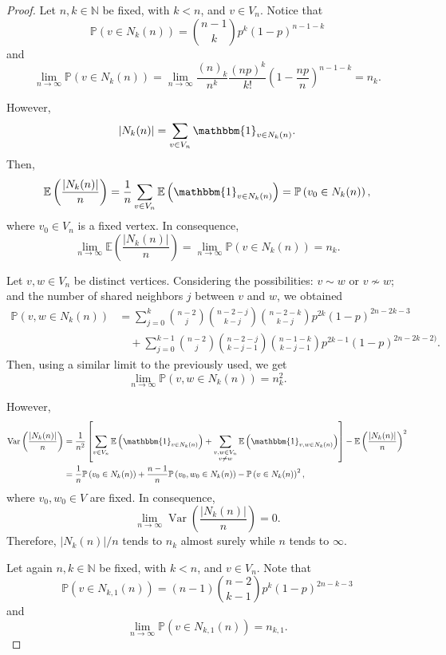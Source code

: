 \documentclass[a4paper]{article}
\newcommand{\N}{\mathbb{N}}
\newcommand{\abs}[1]{\left\lvert#1\right\rvert}
\newcommand{\Pp}[1]{\mathbb{P}\left(#1\right)}
\newcommand{\E}[1]{\mathbb{E}\left(#1\right)}
\DeclareMathOperator{\var}{Var}
\newcommand{\Var}[1]{\var\left(#1\right)}
\theoremstyle{plain}
\begin{document}
\begin{proof}
    Let \(n,k \in \N\) be fixed, with \(k < n\), and \(v \in V_n\). Notice that
    \[
        \Pp{v \in N_k(n)} = \binom{n-1}{k}p^k(1-p)^{n-1-k}
    \]
    and
    \[
        \lim_{n \to \infty} \Pp{v \in N_k(n)} = \lim_{n \to \infty} \frac{(n)_k}{n^k}\frac{(np)^k}{k!} \left(1 - \frac{np}{n}\right)^{n-1-k} = n_k.
    \]
    
    However,
    \[
        \abs{N_k(n)} = \sum_{v \in V_n} \mathbbm{1}_{v \in N_k(n)}.
    \]
    Then,
    \[
        \E{\frac{\abs{N_k(n)}}{n}} = \frac{1}{n}\sum_{v \in V_n} \E{\mathbbm{1}_{v \in N_k(n)}} = \Pp{v_0 \in N_k(n)},
    \]
    where \(v_0 \in V_n\) is a fixed vertex. In consequence,
    \[
        \lim_{n \to \infty} \E{\frac{\abs{N_k(n)}}{n}} = \lim_{n \to \infty} \Pp{v \in N_k(n)} = n_k.
    \]

    Let \(v,w \in V_n\) be distinct vertices. Considering the possibilities: \(v \sim w\) or \(v \not\sim w\); and the number of shared neighbors \(j\) between \(v\) and \(w\), we obtained
    \begin{align*}
        \Pp{v,w \in N_k(n)} &= \sum_{j = 0}^k \binom{n-2}{j}\binom{n-2-j}{k-j}\binom{n-2-k}{k-j}p^{2k}(1-p)^{2n-2k-3}\\
        &\quad + \sum_{j = 0}^{k-1} \binom{n-2}{j}\binom{n-2-j}{k-j-1}\binom{n-1-k}{k-j-1}p^{2k-1}(1-p)^{2n-2k-2)}.
    \end{align*}
    Then, using a similar limit to the previously used, we get
    \[
        \lim_{n \to \infty} \Pp{v,w \in N_k(n)} = n_k^2.
    \]
    
    However,
    \begin{align*}
        \Var{\frac{\abs{N_k(n)}}{n}} &= \frac{1}{n^2}\left[\sum_{v \in V_n}\E{\mathbbm{1}_{v \in N_k(n)}} + \sum_{\substack{v,w \in V_n\\
        v \neq w}} \E{\mathbbm{1}_{v, w \in N_k(n)}}\right] - \E{\frac{\abs{N_k(n)}}{n}}^2\\
        &= \frac{1}{n}\Pp{v_0 \in N_k(n)} + \frac{n-1}{n}\Pp{v_0,w_0 \in N_k(n)} - \Pp{v \in N_k(n)}^2,
    \end{align*}
    where \(v_0,w_0 \in V\) are fixed. In consequence,
    \[
        \lim_{n \to \infty} \Var{\frac{\abs{N_k(n)}}{n}} = 0.
    \]
    Therefore, \(\abs{N_k(n)}/n\) tends to \(n_k\) almost surely while \(n\) tends to \(\infty\).

    Let again \(n,k \in \N\) be fixed, with \(k < n\), and \(v \in V_n\). Note that
    \[
        \Pp{v \in N_{k,1}(n)} = (n-1)\binom{n-2}{k-1}p^k(1-p)^{2n-k-3}
    \]
    and
    \[
        \lim_{n \to \infty} \Pp{v \in N_{k,1}(n)} = n_{k,1}.
    \]


\end{proof}
\end{document}
